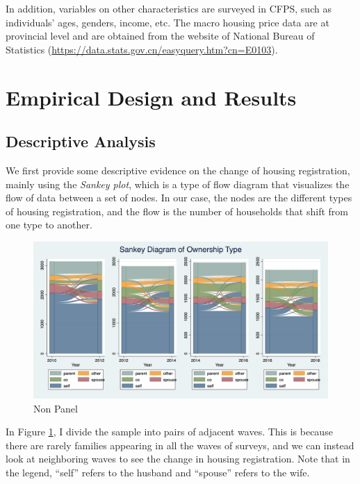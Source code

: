 \documentclass[11pt]{article}
\begin{document}
In addition, variables on other characteristics are surveyed in CFPS, such as individuals' ages, genders, income, etc. The macro housing price data are at provincial level and are obtained from the website of National Bureau of Statistics (\href{https://data.stats.gov.cn/easyquery.htm?cn=E0103}{https://data.stats.gov.cn/easyquery.htm?cn=E0103}).

\section{Empirical Design and Results} \label{sec:method}

\subsection{Descriptive Analysis}

We first provide some descriptive evidence on the change of housing registration, mainly using the \textit{Sankey plot}, which is a type of flow diagram that visualizes the flow of data between a set of nodes. In our case, the nodes are the different types of housing registration, and the flow is the number of households that shift from one type to another.

\begin{figure}
    \centering
    \includegraphics[width = \textwidth]{./graphs_new/sankeyall_nonpanel.png}
    \caption{Non Panel}
    \label{fig:sankeyall_nonpanel}
\end{figure}

In Figure \ref{fig:sankeyall_nonpanel}, I divide the sample into pairs of adjacent waves. This is because there are rarely families appearing in all the waves of surveys, and we can instead look at neighboring waves to see the change in housing registration. Note that in the legend, ``self'' refers to the husband and ``spouse'' refers to the wife.
\end{document}
